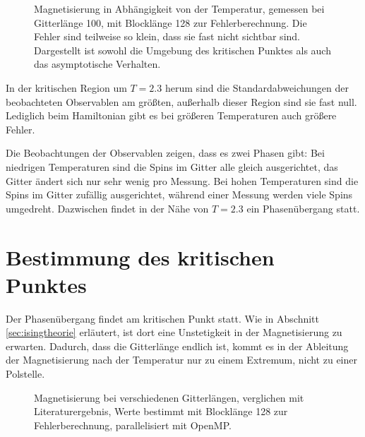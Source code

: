 

	
	\begin{figure}[htbp]
		
		\caption[Magnetisierung in Abhängigkeit von der Temperatur]{Magnetisierung in Abhängigkeit von der Temperatur, gemessen bei Gitterlänge 100, mit Blocklänge 128 zur Fehlerberechnung. Die Fehler sind teilweise so klein, dass sie fast nicht sichtbar sind. Dargestellt ist sowohl die Umgebung des kritischen Punktes als auch das asymptotische Verhalten.}
		\label{fig:ergebnismagnetisierung}
	\end{figure}
	
	In der kritischen Region um $T=\num{2,3}$ herum sind die Standardabweichungen der beobachteten Observablen am größten, außerhalb dieser Region sind sie fast null. Lediglich beim Hamiltonian gibt es bei größeren Temperaturen auch größere Fehler. 
	
	Die Beobachtungen der Observablen zeigen, dass es zwei Phasen gibt: Bei niedrigen Temperaturen sind die Spins im Gitter alle gleich ausgerichtet, das Gitter ändert sich nur sehr wenig pro Messung. Bei hohen Temperaturen sind die Spins im Gitter zufällig ausgerichtet, während einer Messung werden viele Spins umgedreht. Dazwischen findet in der Nähe von $T=\num{2,3}$ ein Phasenübergang statt.
	
	\section{Bestimmung des kritischen Punktes}
	\label{sec:bestkritpunkt}
	
	Der Phasenübergang findet am kritischen Punkt statt. Wie in Abschnitt \ref{sec:isingtheorie} erläutert, ist dort eine Unstetigkeit in der Magnetisierung zu erwarten. Dadurch, dass die Gitterlänge endlich ist, kommt es in der Ableitung der Magnetisierung nach der Temperatur nur zu einem Extremum, nicht zu einer Polstelle. %
		
	\begin{figure}[htbp]
		
		\caption[Magnetisierung bei verschiedenen Gitterlängen und Verwendung von OpenMP]{Magnetisierung bei verschiedenen Gitterlängen, verglichen mit Literaturergebnis, Werte bestimmt mit Blocklänge 128 zur Fehlerberechnung, parallelisiert mit OpenMP.}
		\label{fig:maglaenge}
	\end{figure}


